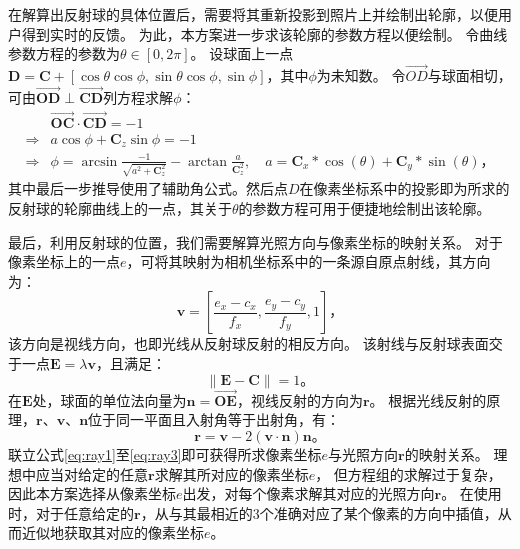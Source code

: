 在解算出反射球的具体位置后，需要将其重新投影到照片上并绘制出轮廓，以便用户得到实时的反馈。
为此，本方案进一步求该轮廓的参数方程以便绘制。
令曲线参数方程的参数为$\theta\in[0, 2\pi]$。
设球面上一点$\mathbf{D} = \mathbf{C} + [\cos\theta \cos\phi, \sin\theta \cos\phi, \sin\phi]$，其中$\phi$为未知数。
令$\overrightarrow{OD}$与球面相切，可由$\overrightarrow{\mathbf{O}\mathbf{D}} \perp \overrightarrow{\mathbf{C}\mathbf{D}}$列方程求解$\phi$：
\begin{equation}
\begin{aligned}
&\overrightarrow{\mathbf{O}\mathbf{C}} \cdot \overrightarrow{\mathbf{C}\mathbf{D}} = -1 \\
\Rightarrow &a \cos\phi + \mathbf{C}_z \sin\phi = -1\\
\Rightarrow &\phi = \arcsin\frac{-1}{\sqrt{a^2 + \mathbf{C}_z^2}} - \arctan\frac{a}{\mathbf{C}_z^2}, \quad a = \mathbf{C}_x * \cos(\theta) + \mathbf{C}_y * \sin(\theta)
\text{，}
\end{aligned}
\end{equation}
其中最后一步推导使用了辅助角公式。然后点$D$在像素坐标系中的投影即为所求的反射球的轮廓曲线上的一点，其关于$\theta$的参数方程可用于便捷地绘制出该轮廓。

最后，利用反射球的位置，我们需要解算光照方向与像素坐标的映射关系。
对于像素坐标上的一点$e$，可将其映射为相机坐标系中的一条源自原点射线，其方向为：
\begin{equation}
    \mathbf{v} = \left[\frac{e_x-c_x}{f_x}, \frac{e_y-c_y}{f_y}, 1\right]
    \text{，}
    \label{eq:ray1}
\end{equation}
该方向是视线方向，也即光线从反射球反射的相反方向。
该射线与反射球表面交于一点$\mathbf{E}=\lambda\mathbf{v}$，且满足：
\begin{equation}
    \| \mathbf{E} - \mathbf{C} \| = 1
    \text{。}
    \label{eq:ray2}
\end{equation}
在$\mathbf{E}$处，球面的单位法向量为$\mathbf{n}=\overrightarrow{\mathbf{O}\mathbf{E}}$，视线反射的方向为$\mathbf{r}$。
根据光线反射的原理，$\mathbf{r}$、$\mathbf{v}$、$\mathbf{n}$位于同一平面且入射角等于出射角，有：
\begin{equation}
    \mathbf{r} = \mathbf{v} - 2(\mathbf{v} \cdot \mathbf{n}) \mathbf{n}
    \text{。}
    \label{eq:ray3}
\end{equation}
联立公式\eqref{eq:ray1}至\eqref{eq:ray3}即可获得所求像素坐标$e$与光照方向$\mathbf{r}$的映射关系。
理想中应当对给定的任意$\mathbf{r}$求解其所对应的像素坐标$e$，
但方程组的求解过于复杂，因此本方案选择从像素坐标$e$出发，对每个像素求解其对应的光照方向$\mathbf{r}$。
在使用时，对于任意给定的$\mathbf{r}$，从与其最相近的3个准确对应了某个像素的方向中插值，从而近似地获取其对应的像素坐标$e$。

